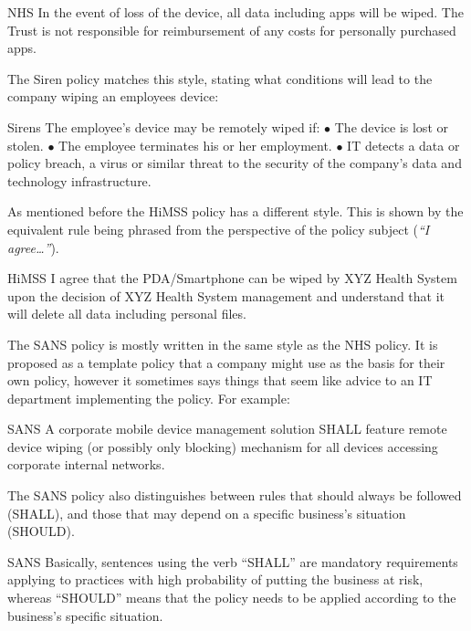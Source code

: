 \documentclass[thesis.tex]{subfiles}
\begin{document}
\begin{policyrule}{NHS}
  In the event of loss of the device, all data including apps will be wiped. The Trust
  is not responsible for reimbursement of any costs for personally purchased apps.
\end{policyrule}

The Siren policy matches this style, stating what conditions will lead to the
company wiping an employees device:

\begin{policyrule}{Sirens}
The employee's device may be remotely wiped if: $\bullet$ The device is lost or
stolen. $\bullet$ The employee terminates his or her employment. $\bullet$ IT
detects a data or policy breach, a virus or similar threat to the security of
the company's data and technology infrastructure.
\end{policyrule}

As mentioned before the \ac{HiMSS} policy has a different style.  This is shown
by the equivalent rule being phrased from the perspective of the policy subject
(\emph{``I agree\dots''}).

\begin{policyrule}{HiMSS}
  I agree that the PDA/Smartphone can be wiped by XYZ Health System upon the
  decision of XYZ Health System management and understand that it will delete all
  data including personal files.
\end{policyrule}

The SANS policy is mostly written in the same style as the NHS policy.  It is
proposed as a template policy that a company might use as the basis for their
own policy, however it sometimes says things that seem like advice to an IT
department implementing the policy.  For example:

\begin{policyrule}{SANS}
   A corporate mobile device management solution SHALL feature remote device
   wiping (or possibly only blocking) mechanism for all devices accessing
   corporate internal networks.
\end{policyrule}

The SANS policy also distinguishes between rules that should always be followed (SHALL),
and those that may depend on a specific business's situation (SHOULD).

\begin{policyrule}{SANS}
  Basically, sentences using the verb ``SHALL'' are mandatory requirements
  applying to practices with high probability of putting the business at risk,
  whereas ``SHOULD'' means that the policy needs to be applied according to the
  business's specific situation.
\end{policyrule}
\end{document}
